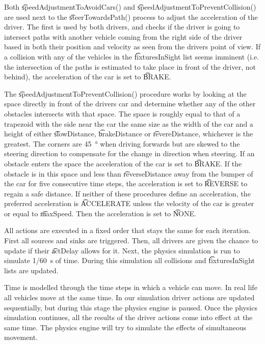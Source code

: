 Both \t{speedAdjustmentToAvoidCars()} and \t{speedAdjustmentToPreventCollision()} are used next to the \t{steerTowardsPath()} process to adjust the acceleration of the driver. The first is used by both drivers, and checks if the driver is going to intersect paths with another vehicle coming from the right side of the driver based in both their position and velocity as seen from the drivers point of view. If a collision with any of the vehicles in the \t{fixturesInSight} list seems imminent (i.e. the intersection of the paths is estimated to take place in front of the driver, not behind), the acceleration of the car is set to \t{BRAKE}.

The \t{speedAdjustmentToPreventCollision()} procedure works by looking at the space directly in front of the drivers car and determine whether any of the other obstacles intersects with that space. The space is roughly equal to that of a trapezoid with the side near the car the same size as the width of the car and a height of either \t{slowDistance}, \t{brakeDistance} or \t{revereDistance}, whichever is the greatest. The corners are \si{45 \degree} when driving forwards but are skewed to the steering direction to compensate for the change in direction when steering. If an obstacle enters the space the acceleration of the car is set to \t{BRAKE}. If the obstacle is in this space and less than \t{reverseDistance} away from the bumper of the car for five consecutive time steps, the acceleration is set to \t{REVERSE} to regain a safe distance.
If neither of these procedures define an acceleration, the preferred acceleration is \t{ACCELERATE} unless the velocity of the car is greater or equal to \t{maxSpeed}. Then the acceleration is set to \t{NONE}.

All actions are executed in a fixed order that stays the same for each iteration. First all sources and sinks are triggered. Then, all drivers are given the chance to update if their \t{actDelay} allows for it. Next, the physics simulation is run to simulate \SI{1/60}{\second} of time. During this simulation all collisions and \t{fixturesInSight} lists are updated.

Time is modelled through the time steps in which a vehicle can move. In real life all vehicles move at the same time. In our simulation driver actions are updated sequentially, but during this stage the physics engine is paused. Once the physics simulation continues, all the results of the driver actions come into effect at the same time. The physics engine will try to simulate the effects of simultaneous movement.